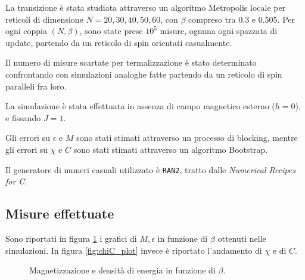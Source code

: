 \documentclass[a4paper,11pt]{article}
\newcommand{\code}[1]{\texttt{#1}}
\begin{document}
	La transizione è stata studiata attraverso un algoritmo Metropolis locale per
	reticoli di dimensione $N = 20,30,40,50,60$, con $\beta$ compreso tra 0.3 e
	0.505. Per ogni coppia $(N, \beta )$,
	sono state prese $10^{5}$ misure, ognuna ogni spazzata di update, partendo da un reticolo di spin orientati casualmente. 
	
	Il numero di misure scartate per termalizzazione è stato determinato confrontando con simulazioni analoghe fatte partendo da un reticolo di spin paralleli fra loro.

	La simulazione è stata effettuata in assenza di campo magnetico esterno
	($h = 0$), e fissando $J = 1$.

	Gli errori su $\epsilon$ e $M$ sono stati
	stimati attraverso un processo di blocking, mentre gli errori su $\chi$ e $C$ sono stati stimati attraverso un algoritmo Bootstrap.

	Il generatore di numeri casuali utilizzato è \code{RAN2}, tratto dalle \emph{Numerical Recipes for C}.
	
	\subsection{Misure effettuate}
	
	Sono riportati in figura \ref{fig:em_plot} i grafici di $M, \epsilon$ in funzione di $\beta$ ottenuti nelle simulazioni. In figura \ref{fig:chiC_plot} invece è riportato l'andamento di $\chi$ e di $C$.
	
	\begin{figure}[htb]
        \caption{Magnetizzazione e densità di energia in funzione di $\beta$.}
        \label{fig:em_plot}
	\end{figure}
	
\end{document}
